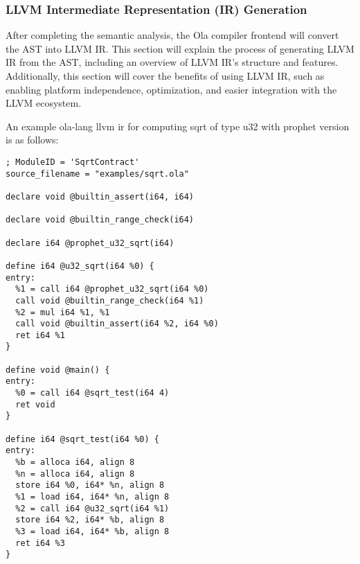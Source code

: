 \subsubsection{LLVM Intermediate Representation (IR) Generation}
After completing the semantic analysis, the Ola compiler frontend will convert the AST into LLVM IR. This section will explain the process of generating LLVM IR from the AST, including an overview of LLVM IR's structure and features. Additionally, this section will cover the benefits of using LLVM IR, such as enabling platform independence, optimization, and easier integration with the LLVM ecosystem.


An example ola-lang llvm ir for computing sqrt of type u32 with prophet version is as follows:
\begin{lstlisting}
; ModuleID = 'SqrtContract'
source_filename = "examples/sqrt.ola"

declare void @builtin_assert(i64, i64)

declare void @builtin_range_check(i64)

declare i64 @prophet_u32_sqrt(i64)

define i64 @u32_sqrt(i64 %0) {
entry:
  %1 = call i64 @prophet_u32_sqrt(i64 %0)
  call void @builtin_range_check(i64 %1)
  %2 = mul i64 %1, %1
  call void @builtin_assert(i64 %2, i64 %0)
  ret i64 %1
}

define void @main() {
entry:
  %0 = call i64 @sqrt_test(i64 4)
  ret void
}

define i64 @sqrt_test(i64 %0) {
entry:
  %b = alloca i64, align 8
  %n = alloca i64, align 8
  store i64 %0, i64* %n, align 8
  %1 = load i64, i64* %n, align 8
  %2 = call i64 @u32_sqrt(i64 %1)
  store i64 %2, i64* %b, align 8
  %3 = load i64, i64* %b, align 8
  ret i64 %3
}
\end{lstlisting}

